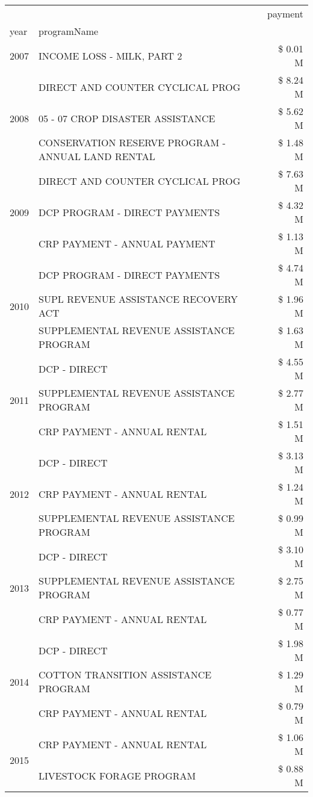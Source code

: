 \begin{tabular}{llr}
\toprule
 &  & payment \\
year & programName &  \\
\midrule
2007 & INCOME LOSS - MILK, PART 2 & \$ 0.01 M \\
\cline{1-3}
\multirow[t]{3}{*}{2008} & DIRECT AND COUNTER CYCLICAL PROG & \$ 8.24 M \\
 & 05 - 07 CROP DISASTER ASSISTANCE & \$ 5.62 M \\
 & CONSERVATION RESERVE PROGRAM - ANNUAL LAND RENTAL & \$ 1.48 M \\
\cline{1-3}
\multirow[t]{3}{*}{2009} & DIRECT AND COUNTER CYCLICAL PROG & \$ 7.63 M \\
 & DCP PROGRAM - DIRECT PAYMENTS & \$ 4.32 M \\
 & CRP PAYMENT - ANNUAL PAYMENT & \$ 1.13 M \\
\cline{1-3}
\multirow[t]{3}{*}{2010} & DCP PROGRAM - DIRECT PAYMENTS & \$ 4.74 M \\
 & SUPL REVENUE ASSISTANCE RECOVERY ACT & \$ 1.96 M \\
 & SUPPLEMENTAL REVENUE ASSISTANCE PROGRAM & \$ 1.63 M \\
\cline{1-3}
\multirow[t]{3}{*}{2011} & DCP - DIRECT & \$ 4.55 M \\
 & SUPPLEMENTAL REVENUE ASSISTANCE PROGRAM & \$ 2.77 M \\
 & CRP PAYMENT - ANNUAL RENTAL & \$ 1.51 M \\
\cline{1-3}
\multirow[t]{3}{*}{2012} & DCP - DIRECT & \$ 3.13 M \\
 & CRP PAYMENT - ANNUAL RENTAL & \$ 1.24 M \\
 & SUPPLEMENTAL REVENUE ASSISTANCE PROGRAM & \$ 0.99 M \\
\cline{1-3}
\multirow[t]{3}{*}{2013} & DCP - DIRECT & \$ 3.10 M \\
 & SUPPLEMENTAL REVENUE ASSISTANCE PROGRAM & \$ 2.75 M \\
 & CRP PAYMENT - ANNUAL RENTAL & \$ 0.77 M \\
\cline{1-3}
\multirow[t]{3}{*}{2014} & DCP - DIRECT & \$ 1.98 M \\
 & COTTON TRANSITION ASSISTANCE PROGRAM & \$ 1.29 M \\
 & CRP PAYMENT - ANNUAL RENTAL & \$ 0.79 M \\
\cline{1-3}
\multirow[t]{3}{*}{2015} & CRP PAYMENT - ANNUAL RENTAL & \$ 1.06 M \\
 & LIVESTOCK FORAGE PROGRAM & \$ 0.88 M \\

\end{tabular}
